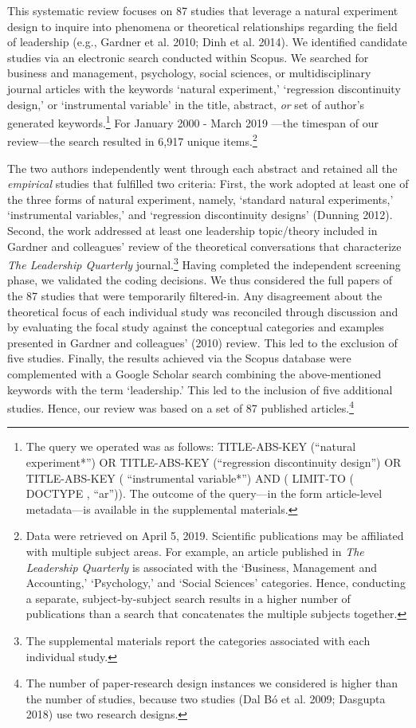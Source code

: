 \documentclass[english]{article}
\begin{document}
\noindent This systematic review focuses on 87 studies that leverage a natural
experiment design to inquire into phenomena or theoretical relationships
regarding the field of leadership (e.g., Gardner et al. 2010; Dinh et al. 2014).
We identified candidate studies via an electronic search conducted within
Scopus. We searched for business and management, psychology, social sciences, or
multidisciplinary journal articles with the keywords `natural experiment,'
`regression discontinuity design,' or `instrumental variable' in the title,
abstract, \emph{or} set of author's generated keywords.\footnote{The query we
	operated was as follows: TITLE-ABS-KEY (``natural experiment*'') OR
	TITLE-ABS-KEY (``regression discontinuity design'') OR TITLE-ABS-KEY (
``instrumental variable*'') AND ( LIMIT-TO ( DOCTYPE , ``ar'')). The outcome of
the query---in the form article-level metadata---is available in the
supplemental materials.} For January 2000 - March 2019 ---the timespan of our
review---the search resulted in 6,917 unique items.\footnote{Data were retrieved
	on April 5, 2019. Scientific publications may be affiliated with
	multiple subject areas. For example, an article published in \emph{The
	Leadership Quarterly} is associated with the `Business, Management and
	Accounting,' `Psychology,' and `Social Sciences' categories. Hence,
	conducting a separate, subject-by-subject search results in a higher
	number of publications than a search that concatenates the multiple
subjects together.}

The two authors independently went through each abstract and retained all the
\emph{empirical} studies that fulfilled two criteria: First, the work adopted at
least one of the three forms of natural experiment, namely, `standard natural
experiments,' `instrumental variables,' and `regression discontinuity designs'
(Dunning 2012). Second, the work addressed at least one leadership topic/theory
included in Gardner and colleagues' review of the theoretical conversations that
characterize \emph{The Leadership Quarterly} journal.\footnote{The supplemental
materials report the categories associated with each individual study.} Having
completed the independent screening phase, we validated the coding decisions. We
thus considered the full papers of the 87 studies that were temporarily
filtered-in. Any disagreement about the theoretical focus of each individual
study was reconciled through discussion and by evaluating the focal study
against the conceptual categories and examples presented in Gardner and
colleagues' (2010) review. This led to the exclusion of five studies. Finally,
the results achieved via the Scopus database were complemented with a Google
Scholar search combining the above-mentioned keywords with the term
`leadership.' This led to the inclusion of five additional studies.  Hence, our
review was based on a set of 87 published articles.\footnote{The number of
	paper-research design instances we considered is higher than the number
of studies, because two studies (Dal Bó et al. 2009; Dasgupta 2018) use two
research designs.}
\end{document}
